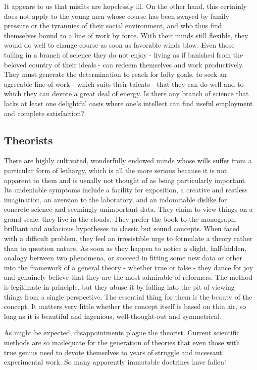 \documentclass{article}
\begin{document}
It appears to us that misfits are hopelessly ill. On the other hand, this certainly does not apply to the young men whose course has been swayed by family pressure or the tyrannies of their social environment, and who thus find themselves bound to a line of work by force. With their minds still flexible, they would do well to change course as soon as favorable winds blow. Even those toiling in a branch of science they do not enjoy - living as if banished from the beloved country of their ideals - can redeem themselves and work productively. They must generate the determination to reach for lofty goals, to seek an agreeable line of work - which suits their talents - that they can do well and to which they can devote a great deal of energy. Is there any branch of science that lacks at least one delightful oasis where one’s intellect can find useful employment and complete satisfaction?

\subsection*{Theorists}

There are highly cultivated, wonderfully endowed minds whose wills suffer from a particular form of lethargy, which is all the more serious because it is not apparent to them and is usually not thought of as being particularly important. Its undeniable symptoms include a facility for exposition, a creative and restless imagination, an aversion to the laboratory, and an indomitable dislike for concrete science and seemingly unimportant data. They claim to view things on a grand scale; they live in the clouds. They prefer the book to the monograph, brilliant and audacious hypotheses to classic but sound concepts. When faced with a difficult problem, they feel an irresistible urge to formulate a theory rather than to question nature. As soon as they happen to notice a slight, half-hidden, analogy between two phenomena, or succeed in fitting some new data or other into the framework of a general theory - whether true or false - they dance for joy and genuinely believe that they are the most admirable of reformers. The method is legitimate in principle, but they abuse it by falling into the pit of viewing things from a single perspective. The essential thing for them is the beauty of the concept. It matters very little whether the concept itself is based on thin air, so long as it is beautiful and ingenious, well-thought-out and symmetrical.

As might be expected, disappointments plague the theorist. Current scientific methods are so inadequate for the generation of theories that even those with true genius need to devote themselves to years of struggle and incessant experimental work. So many apparently immutable doctrines have fallen!
\end{document}
